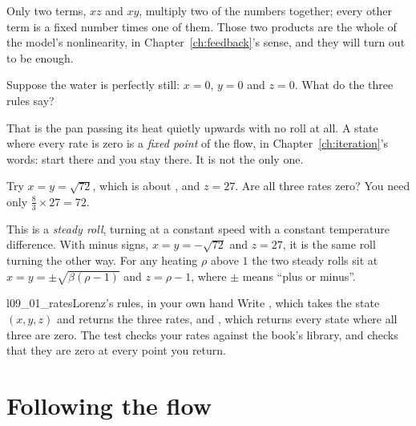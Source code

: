 \noindent
Only two terms, $xz$ and $xy$, multiply two of the numbers together; every
other term is a fixed number times one of them. Those two products are the
whole of the model's nonlinearity, in Chapter~\ref{ch:feedback}'s sense, and
they will turn out to be enough.


\begin{think}
Suppose the water is perfectly still: $x = 0$, $y = 0$ and $z = 0$. What do
the three rules say?
\end{think}
That is the pan passing its heat quietly upwards with no roll at all. A state
where every rate is zero is a \emph{fixed point} of the flow, in
Chapter~\ref{ch:iteration}'s words: start there and you stay there. It is
not the only one.

\begin{think}
Try $x = y = \sqrt{72}$, which is about , and $z = 27$. Are
all three rates zero? You need only $\tfrac{8}{3} \times 27 = 72$.
\end{think}
This is a \emph{steady roll}, turning at a constant speed with a constant
temperature difference. With minus signs, $x = y = -\sqrt{72}$ and $z = 27$,
it is the same roll turning the other way. For any heating $\rho$ above $1$
the two steady rolls sit at $x = y = \pm\sqrt{\beta(\rho - 1)}$ and
$z = \rho - 1$, where $\pm$ means \enquote{plus or minus}.

\begin{lab}{l09_01_rates}{Lorenz's rules, in your own hand}
Write , which takes the state $(x, y, z)$ and returns the three
rates, and , which returns every state where all three
are zero. The test checks your rates against the book's library, and checks
that they are zero at every point you return.
\end{lab}

\section{Following the flow}
\label{sec:ch09-flow}


